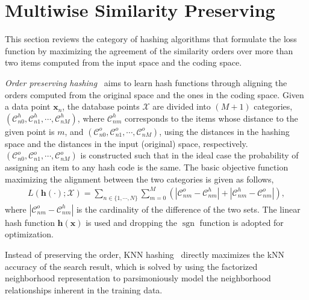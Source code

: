 \documentclass[10pt,journal,compsoc]{IEEEtran}
\begin{document}
\section{Multiwise Similarity Preserving}
\label{sec:multiplewise}
This section reviews the category of hashing algorithms
that formulate the loss function
by maximizing the agreement
of the similarity orders over more than two items
computed from the input space and the coding space.

\emph{Order preserving hashing}~\cite{WangWYL13}
aims to learn hash functions through aligning the orders
computed from the original space
and the ones in the coding space.
Given a data point $\mathbf{x}_n$,
the database points $\mathcal{X}$
are divided into $(M+1)$ categories,
$(\mathcal{C}^h_{n0}, \mathcal{C}^h_{n1},\cdots,\mathcal{C}^h_{nM})$,
where $\mathcal{C}^h_{nm}$
corresponds to the items whose distance to the given point is $m$,
and
$(\mathcal{C}^o_{n0}, \mathcal{C}^o_{n1},\cdots,\mathcal{C}^o_{nM})$,
using the distances in the hashing space
and the distances in the input (original) space, respectively.
$(\mathcal{C}^o_{n0}, \mathcal{C}^o_{n1},\cdots,\mathcal{C}^o_{nM})$ is constructed
such that
in the ideal case
the probability of assigning an item to any hash code
is the same.
The basic objective function maximizing the alignment between the two categories
is given as follows,
\begin{align}
L(\mathbf{h}(\cdot); \mathcal{X})
=\sum\nolimits_{n\in\{1,\cdots,N\}} \sum_{m=0}^{M} (|\mathcal{C}^o_{nm} - \mathcal{C}^h_{nm}| + |\mathcal{C}^h_{nm} - \mathcal{C}^o_{nm}|), \nonumber
\end{align}
where $|\mathcal{C}^o_{nm} - \mathcal{C}^h_{nm}|$
is the cardinality of the difference of the two sets.
The linear hash function $\mathbf{h}(\mathbf{x})$
is used and
dropping the $\operatorname{sgn}$ function is adopted
for optimization.

Instead of preserving the order,
KNN hashing~\cite{DingHFP15} directly maximizes the kNN accuracy of the search result,
which is solved by using the factorized neighborhood representation to parsimoniously model
the neighborhood relationships inherent in the training data.
\end{document}
